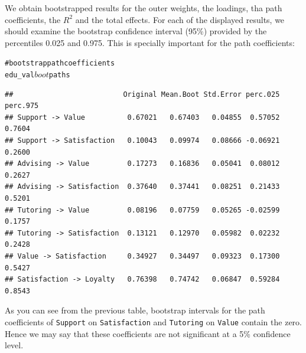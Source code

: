 \documentclass[12pt]{book}\usepackage{graphicx, color}
\makeatletter
\newcommand{\hlcomment}[1]{\textcolor[rgb]{0.180392156862745,0.6,0.341176470588235}{#1}}%
\newenvironment{kframe}{%
 \def\at@end@of@kframe{}%
 \ifinner\ifhmode%
  \def\at@end@of@kframe{\end{minipage}}%
  \begin{minipage}{\columnwidth}%
 \fi\fi%
 \def\FrameCommand##1{\hskip\@totalleftmargin \hskip-\fboxsep
 \colorbox{shadecolor}{##1}\hskip-\fboxsep
     \hskip-\linewidth \hskip-\@totalleftmargin \hskip\columnwidth}%
 \MakeFramed {\advance\hsize-\width
   \@totalleftmargin\z@ \linewidth\hsize
   \@setminipage}}%
 {\par\unskip\endMakeFramed%
 \at@end@of@kframe}
\newenvironment{knitrout}{}{} %
\newcommand{\code}[1]{\texttt{#1}}
\makeatother
\begin{document}
We obtain bootstrapped results for the outer weights, the loadings, tha path coefficients, the $R^2$ and the total effects. For each of the displayed results, we should examine the bootstrap confidence interval (95\%) provided by the percentiles 0.025 and 0.975. This is specially important for the path coefficients:
\begin{knitrout}
\color{fgcolor}\begin{kframe}
\begin{alltt}
\hlcomment{# bootstrap path coefficients}
edu_val$boot$paths
\end{alltt}
\begin{verbatim}
##                          Original Mean.Boot Std.Error perc.025 perc.975
## Support -> Value          0.67021   0.67403   0.04855  0.57052   0.7604
## Support -> Satisfaction   0.10043   0.09974   0.08666 -0.06921   0.2600
## Advising -> Value         0.17273   0.16836   0.05041  0.08012   0.2627
## Advising -> Satisfaction  0.37640   0.37441   0.08251  0.21433   0.5201
## Tutoring -> Value         0.08196   0.07759   0.05265 -0.02599   0.1757
## Tutoring -> Satisfaction  0.13121   0.12970   0.05982  0.02232   0.2428
## Value -> Satisfaction     0.34927   0.34497   0.09323  0.17300   0.5427
## Satisfaction -> Loyalty   0.76398   0.74742   0.06847  0.59284   0.8543
\end{verbatim}
\end{kframe}
\end{knitrout}

As you can see from the previous table, bootstrap intervals for the path coefficients of \code{Support} on \code{Satisfaction} and \code{Tutoring} on \code{Value} contain the zero. Hence we may say that these coefficients are not significant at a 5\% confidence level.
\end{document}
